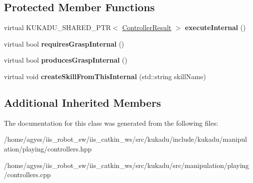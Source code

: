 \subsection*{Protected Member Functions}
\begin{DoxyCompactItemize}
\item 
virtual K\+U\+K\+A\+D\+U\+\_\+\+S\+H\+A\+R\+E\+D\+\_\+\+P\+TR$<$ \hyperlink{classkukadu_1_1ControllerResult}{Controller\+Result} $>$ {\bfseries execute\+Internal} ()\hypertarget{classkukadu_1_1ConcatController_a46085ee6b167c7346f4df145cf77b7ae}{}\label{classkukadu_1_1ConcatController_a46085ee6b167c7346f4df145cf77b7ae}

\item 
virtual bool {\bfseries requires\+Grasp\+Internal} ()\hypertarget{classkukadu_1_1ConcatController_a484ae26504bb10e138b1696490efcbca}{}\label{classkukadu_1_1ConcatController_a484ae26504bb10e138b1696490efcbca}

\item 
virtual bool {\bfseries produces\+Grasp\+Internal} ()\hypertarget{classkukadu_1_1ConcatController_a6ee16ba5bf9fdbd96c2acad0f2b5296d}{}\label{classkukadu_1_1ConcatController_a6ee16ba5bf9fdbd96c2acad0f2b5296d}

\item 
virtual void {\bfseries create\+Skill\+From\+This\+Internal} (std\+::string skill\+Name)\hypertarget{classkukadu_1_1ConcatController_a263e30b89975e5c7934625472bdcf0b8}{}\label{classkukadu_1_1ConcatController_a263e30b89975e5c7934625472bdcf0b8}

\end{DoxyCompactItemize}
\subsection*{Additional Inherited Members}


The documentation for this class was generated from the following files\+:\begin{DoxyCompactItemize}
\item 
/home/agyss/iis\+\_\+robot\+\_\+sw/iis\+\_\+catkin\+\_\+ws/src/kukadu/include/kukadu/manipulation/playing/controllers.\+hpp\item 
/home/agyss/iis\+\_\+robot\+\_\+sw/iis\+\_\+catkin\+\_\+ws/src/kukadu/src/manipulation/playing/controllers.\+cpp\end{DoxyCompactItemize}
